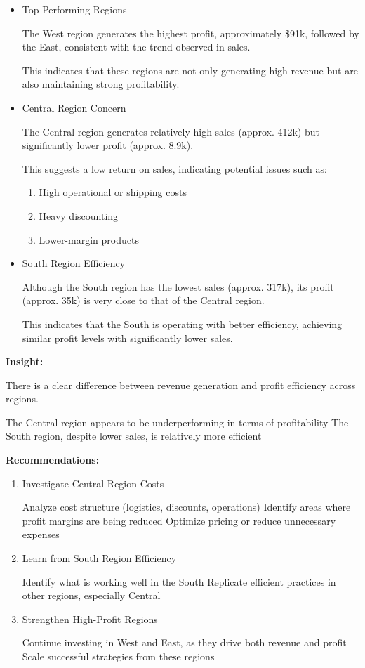 \documentclass[
  letterpaper,
  DIV=11,
  numbers=noendperiod]{scrartcl}
\begin{document}
\begin{itemize}
\item
  Top Performing Regions

  The West region generates the highest profit, approximately \$91k,
  followed by the East, consistent with the trend observed in sales.

  This indicates that these regions are not only generating high revenue
  but are also maintaining strong profitability.
\item
  Central Region Concern

  The Central region generates relatively high sales (approx. 412k) but
  significantly lower profit (approx. 8.9k).

  This suggests a low return on sales, indicating potential issues such
  as:

  \begin{enumerate}
  \def\labelenumi{\arabic{enumi}.}
  \item
    High operational or shipping costs
  \item
    Heavy discounting
  \item
    Lower-margin products
  \end{enumerate}
\item
  South Region Efficiency

  Although the South region has the lowest sales (approx. 317k), its
  profit (approx. 35k) is very close to that of the Central region.

  This indicates that the South is operating with better efficiency,
  achieving similar profit levels with significantly lower sales.
\end{itemize}

\textbf{Insight:}

There is a clear difference between revenue generation and profit
efficiency across regions.

The Central region appears to be underperforming in terms of
profitability The South region, despite lower sales, is relatively more
efficient

\textbf{Recommendations:}

\begin{enumerate}
\def\labelenumi{\arabic{enumi}.}
\item
  Investigate Central Region Costs

  Analyze cost structure (logistics, discounts, operations) Identify
  areas where profit margins are being reduced Optimize pricing or
  reduce unnecessary expenses
\item
  Learn from South Region Efficiency

  Identify what is working well in the South Replicate efficient
  practices in other regions, especially Central
\item
  Strengthen High-Profit Regions

  Continue investing in West and East, as they drive both revenue and
  profit Scale successful strategies from these regions
\end{enumerate}
\end{document}
